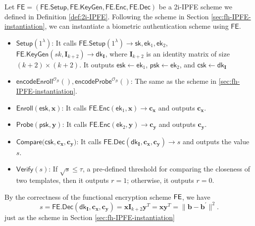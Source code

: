 Let $\textsf{FE} = (\textsf{FE.Setup}, \textsf{FE.KeyGen}, \textsf{FE.Enc}, \textsf{FE.Dec})$ be a 2i-IPFE scheme we defined in Definition \ref{def:2i-IPFE}. Following the scheme in Section \ref{sec:fh-IPFE-instantiation}, we can instantiate a biometric authentication scheme using $\textsf{FE}$.

\begin{itemize}

	\item $\textsf{Setup}(1^\lambda)$: It calls $\textsf{FE.Setup}(1^\lambda) \to \textsf{sk}, \textsf{ek}_1, \textsf{ek}_2$, $ \textsf{FE.KeyGen}(sk, \mathbf{I}_{k+2}) \to \textsf{dk}_{\mathbf{I}} $, where $\mathbf{I}_{k+2}$ is an identity matrix of size $(k+2) \times (k+2)$. It outputs $\textsf{esk} \gets \textsf{ek}_1$, $\textsf{psk} \gets \textsf{ek}_2$, and $\textsf{csk} \gets \textsf{dk}_{\mathbf{I}}$

	\item $\textsf{encodeEnroll}^{\mathcal{O}_{\mathcal{B}}}(), \textsf{encodeProbe}^{\mathcal{O}_{\mathcal{B}}}()$: The same as the scheme in \ref{sec:fh-IPFE-instantiation}. 

	\item $\textsf{Enroll}(\textsf{esk}, \mathbf{x})$: It calls $\textsf{FE.Enc}(\textsf{ek}_1, \mathbf{x}) \to \mathbf{c_x}$ and outputs $\mathbf{c_x}$.

	\item $\textsf{Probe}(\textsf{psk}, \mathbf{y})$: It calls $\textsf{FE.Enc}(\textsf{ek}_2, \mathbf{y}) \to \mathbf{c_y}$ and outputs $\mathbf{c_y}$.

	\item $\textsf{Compare}(\textsf{csk}, \mathbf{c_x}, \mathbf{c_y)}$: It calls $\textsf{FE.Dec}(\textsf{dk}_{\mathbf{I}}, \mathbf{c_x}, \mathbf{c_y}) \to s$ and outputs the value $s$.

	\item $\textsf{Verify}(s)$: If $\sqrt{s} \leq \tau$, a pre-defined threshold for comparing the closeness of two templates, then it outputs $r = 1$; otherwise, it outputs $r = 0$.

\end{itemize}

By the correctness of the functional encryption scheme $\sf FE$, we have
\[
	s = \textsf{FE.Dec}(\textsf{dk}_{\mathbf{I}}, \mathbf{c_x}, \mathbf{c_y}) =  \mathbf{x} \mathbf{I}_{k+2} \mathbf{y}^T = \mathbf{x} \mathbf{y}^T = \| \mathbf{b} - \mathbf{b}^\prime \|^2.
\]
just as the scheme in Section \ref{sec:fh-IPFE-instantiation}


